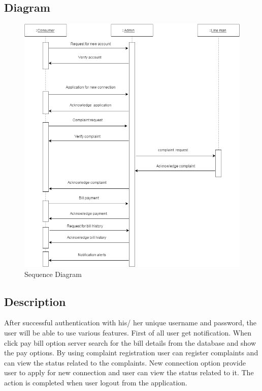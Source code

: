 \documentclass[12pt,a4paper,oneside]{report}
\begin{document}
\subsection{Diagram}
\begin{figure}[H]
  	\begin{center}
  		\includegraphics[scale=0.5]{sdnew.png}
  			\caption{Sequence Diagram}
  			\label{Sequence Diagram}
  	\end{center}
  \end{figure}
 \newpage
\subsection{Description}
After successful authentication with his/ her unique username and password, the user will
be able to use various features. First of all user get notification. When click pay bill option server search for the bill details from the database and show the pay options. By using complaint registration user can register complaints and can view the status related to the complaints. New connection option provide user to apply for new connection and user can view the status related to it. The action is completed when
user logout from the application.
\end{document}
